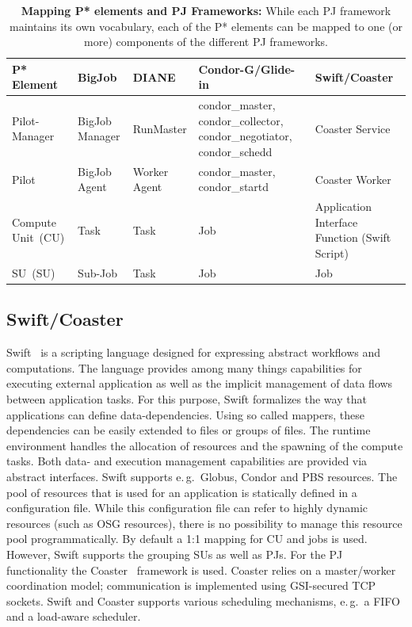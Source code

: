 \documentclass[conference,final]{IEEEtran}
\newcommand{\pilot}{Pilot\xspace}
\newcommand{\computeunit}{Compute Unit\xspace}
\newcommand{\cu}{CU\xspace}
\newcommand{\su}{SU\xspace}
\newcommand{\upp}{\vspace*{-0.5em}}
\begin{document}
\begin{table}[t]
\centering
\begin{tabular}{|p{2.5cm}|p{3cm}|p{3cm}|p{3cm}|p{3cm}|}
  \hline
  \textbf{P* Element} &\textbf{BigJob} &\textbf{DIANE} &\textbf{Condor-G/Glide-in} &\textbf{Swift/Coaster}  \\
  \hline
  Pilot-Manager &BigJob Manager & RunMaster & condor\_master, condor\_collector, condor\_negotiator, condor\_schedd &Coaster Service\\ 
  \hline
  \pilot &BigJob Agent  & Worker Agent &condor\_master, condor\_startd &Coaster Worker\\
  \hline
  \computeunit  \ (CU) &Task &Task &Job &Application Interface Function (Swift Script)\\
  \hline
  \su \ (SU) &Sub-Job &Task &Job &Job\\
\hline
\end{tabular}
\caption{\textbf{Mapping P* elements and PJ Frameworks:} While each PJ framework maintains its own vocabulary, each of the P* elements can be mapped to one (or more) components of the different PJ frameworks.\upp} \label{table:bigjob-saga-diane}
\end{table}




\upp
\subsection{Swift/Coaster\upp\upp}

Swift~\cite{Wilde2011} is a scripting language designed for expressing
abstract workflows and computations. The language provides among many
things capabilities for executing external application as well as the
implicit management of data flows between application tasks. For this
purpose, Swift formalizes the way that applications can define
data-dependencies. Using so called mappers, these dependencies can be
easily extended to files or groups of files. The runtime environment
handles the allocation of resources and the spawning of the compute
tasks. Both data- and execution management capabilities are provided
via abstract interfaces. Swift supports e.\,g.\ Globus, Condor and PBS
resources.  The pool of resources that is used for an application is
statically defined in a configuration file. While this configuration
file can refer to highly dynamic resources (such as OSG resources),
there is no possibility to manage this resource pool
programmatically. By default a 1:1 mapping for \cu and jobs is
used. However, Swift supports the grouping SUs as well as PJs. For the
PJ functionality the Coaster~\cite{coasters} framework is
used. Coaster relies on a master/worker coordination model;
communication is implemented using GSI-secured TCP sockets. Swift and
Coaster supports various scheduling mechanisms, e.\,g.\ a FIFO and a
load-aware scheduler.
\end{document}
